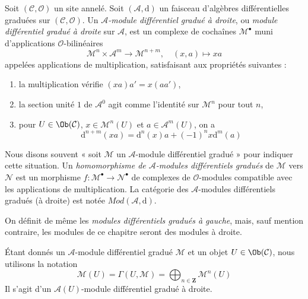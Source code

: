 \begin{definition}
\label{definition-dgm}
Soit $(\mathcal{C}, \mathcal{O})$ un site annelé.
Soit $(\mathcal{A}, \text{d})$ un faisceau d'algèbres différentielles graduées sur $(\mathcal{C}, \mathcal{O})$.
Un {\it $\mathcal{A}$-module différentiel gradué à droite}, ou {\it module différentiel gradué à droite} sur $\mathcal{A}$, est un complexe de cochaînes $\mathcal{M}^\bullet$ muni d'applications $\mathcal{O}$-bilinéaires
$$
\mathcal{M}^n \times \mathcal{A}^m \to \mathcal{M}^{n + m},\quad
(x, a) \longmapsto xa
$$
appelées applications de multiplication, satisfaisant aux propriétés suivantes :
\begin{enumerate}
\item la multiplication vérifie $(xa)a' = x(aa')$,
\item la section unité $1$ de $\mathcal{A}^0$ agit comme l'identité sur $\mathcal{M}^n$ pour tout $n$,
\item pour $U \in \Ob(\mathcal{C})$, $x \in \mathcal{M}^n(U)$ et $a \in \mathcal{A}^m(U)$, on a
$$
\text{d}^{n + m}(xa) = \text{d}^n(x)a + (-1)^n x\text{d}^m(a)
$$
\end{enumerate}
Nous disons souvent « soit $\mathcal{M}$ un $\mathcal{A}$-module différentiel gradué » pour indiquer cette situation.
Un {\it homomorphisme de $\mathcal{A}$-modules différentiels gradués} de $\mathcal{M}$ vers $\mathcal{N}$ est un morphisme $f : \mathcal{M}^\bullet \to \mathcal{N}^\bullet$ de complexes de $\mathcal{O}$-modules compatible avec les applications de multiplication.
La catégorie des $\mathcal{A}$-modules différentiels gradués (à droite) est notée $\textit{Mod}(\mathcal{A}, \text{d})$.
\end{definition}

\noindent
On définit de même les {\it modules différentiels gradués à gauche}, mais, sauf mention contraire, les modules de ce chapitre seront des modules à droite.

\medskip\noindent
Étant donnés un $\mathcal{A}$-module différentiel gradué $\mathcal{M}$ et un objet $U \in \Ob(\mathcal{C})$, nous utilisons la notation
$$
\mathcal{M}(U) =
\Gamma(U, \mathcal{M}) =
\bigoplus\nolimits_{n \in \mathbf{Z}} \mathcal{M}^n(U)
$$
Il s'agit d'un $\mathcal{A}(U)$-module différentiel gradué à droite.

